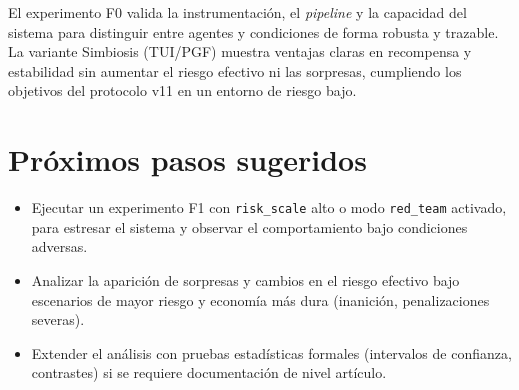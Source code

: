 \documentclass[11pt]{article}
\begin{document}
El experimento F0 valida la instrumentación, el \emph{pipeline} y la capacidad del sistema para distinguir entre agentes y condiciones de forma robusta y trazable. La variante Simbiosis (TUI/PGF) muestra ventajas claras en recompensa y estabilidad sin aumentar el riesgo efectivo ni las sorpresas, cumpliendo los objetivos del protocolo v11 en un entorno de riesgo bajo.

\section{Próximos pasos sugeridos}

\begin{itemize}
  \item Ejecutar un experimento F1 con \texttt{risk\_scale} alto o modo \texttt{red\_team} activado, para estresar el sistema y observar el comportamiento bajo condiciones adversas.
  \item Analizar la aparición de sorpresas y cambios en el riesgo efectivo bajo escenarios de mayor riesgo y economía más dura (inanición, penalizaciones severas).
  \item Extender el análisis con pruebas estadísticas formales (intervalos de confianza, contrastes) si se requiere documentación de nivel artículo.
\end{itemize}
\end{document}
